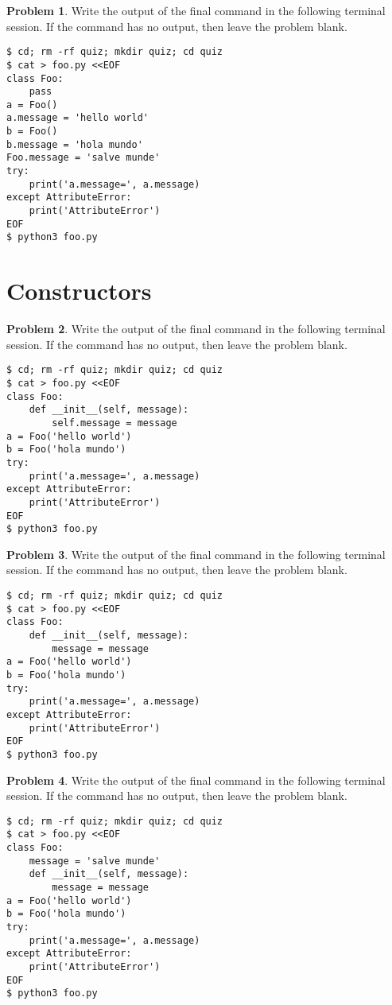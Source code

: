 \documentclass[10pt]{article}
\theoremstyle{definition}
\newtheorem{problem}{Problem}
\begin{document}
\filbreak
\begin{problem}
    Write the output of the final command in the following terminal session.
    If the command has no output, then leave the problem blank.
\end{problem}
\begin{lstlisting}
$ cd; rm -rf quiz; mkdir quiz; cd quiz
$ cat > foo.py <<EOF
class Foo:
    pass
a = Foo()
a.message = 'hello world'
b = Foo()
b.message = 'hola mundo'
Foo.message = 'salve munde'
try:
    print('a.message=', a.message)
except AttributeError:
    print('AttributeError') 
EOF
$ python3 foo.py
\end{lstlisting}


\section{Constructors}

\filbreak
\begin{problem}
    Write the output of the final command in the following terminal session.
    If the command has no output, then leave the problem blank.
\end{problem}
\begin{lstlisting}
$ cd; rm -rf quiz; mkdir quiz; cd quiz
$ cat > foo.py <<EOF
class Foo:
    def __init__(self, message):
        self.message = message
a = Foo('hello world')
b = Foo('hola mundo')
try:
    print('a.message=', a.message)
except AttributeError:
    print('AttributeError') 
EOF
$ python3 foo.py
\end{lstlisting}

\filbreak
\begin{problem}
    Write the output of the final command in the following terminal session.
    If the command has no output, then leave the problem blank.
\end{problem}
\begin{lstlisting}
$ cd; rm -rf quiz; mkdir quiz; cd quiz
$ cat > foo.py <<EOF
class Foo:
    def __init__(self, message):
        message = message
a = Foo('hello world')
b = Foo('hola mundo')
try:
    print('a.message=', a.message)
except AttributeError:
    print('AttributeError') 
EOF
$ python3 foo.py
\end{lstlisting}


\filbreak
\begin{problem}
    Write the output of the final command in the following terminal session.
    If the command has no output, then leave the problem blank.
\end{problem}
\begin{lstlisting}
$ cd; rm -rf quiz; mkdir quiz; cd quiz
$ cat > foo.py <<EOF
class Foo:
    message = 'salve munde'
    def __init__(self, message):
        message = message
a = Foo('hello world')
b = Foo('hola mundo')
try:
    print('a.message=', a.message)
except AttributeError:
    print('AttributeError') 
EOF
$ python3 foo.py
\end{lstlisting}
\end{document}
